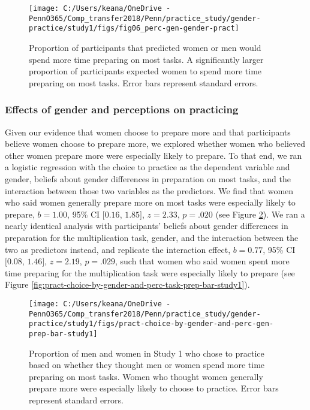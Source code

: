 \documentclass[letterpaper, nobind]{templates/ociamthesis}
\begin{document}
\begin{figure}

{\centering \texttt{[image: C:/Users/keana/OneDrive - PennO365/Comp\_transfer2018/Penn/practice\_study/gender-practice/study1/figs/fig06\_perc-gen-gender-pract]} 

}

\caption{Proportion of participants that predicted women or men would spend more time preparing on most tasks. A significantly larger proportion of participants expected women to spend more time preparing on most tasks. Error bars represent standard errors.}\label{fig:s106}
\end{figure}

\hypertarget{effects-of-gender-and-perceptions-on-practicing}{%
\subsubsection{Effects of gender and perceptions on practicing}\label{effects-of-gender-and-perceptions-on-practicing}}

Given our evidence that women choose to prepare more and that participants believe women choose to prepare more, we explored whether women who believed other women prepare more were especially likely to prepare. To that end, we ran a logistic regression with the choice to practice as the dependent variable and gender, beliefs about gender differences in preparation on most tasks, and the interaction between those two variables as the predictors. We find that women who said women generally prepare more on most tasks were especially likely to prepare, \(b = 1.00\), 95\% CI \([0.16\), \(1.85]\), \(z = 2.33\), \(p = .020\) (see Figure \ref{fig:pract-choice-by-gender-and-perc-gen-prep-bar-study1}). We ran a nearly identical analysis with participants' beliefs about gender differences in preparation for the multiplication task, gender, and the interaction between the two as predictors instead, and replicate the interaction effect, \(b = 0.77\), 95\% CI \([0.08\), \(1.46]\), \(z = 2.19\), \(p = .029\), such that women who said women spent more time preparing for the multiplication task were especially likely to prepare (see Figure \ref{fig:pract-choice-by-gender-and-perc-task-prep-bar-study1}).

\begin{figure}

{\centering \texttt{[image: C:/Users/keana/OneDrive - PennO365/Comp\_transfer2018/Penn/practice\_study/gender-practice/study1/figs/pract-choice-by-gender-and-perc-gen-prep-bar-study1]} 

}

\caption{Proportion of men and women in Study 1 who chose to practice based on whether they thought men or women spend more time preparing on most tasks. Women who thought women generally prepare more were especially likely to choose to practice. Error bars represent standard errors.}\label{fig:pract-choice-by-gender-and-perc-gen-prep-bar-study1}
\end{figure}
\end{document}
